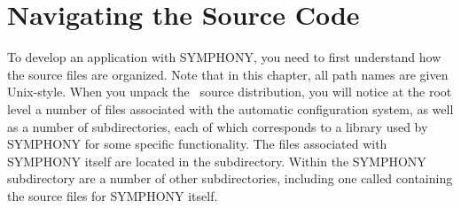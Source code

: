 
\section{Navigating the Source Code}

To develop an application with SYMPHONY, you need to first understand how the
source files are organized. Note that in this chapter, all path names are
given Unix-style. When you unpack the \BB\ source distribution, you will
notice at the root level a number of files associated with the automatic
configuration system, as well as a number of subdirectories, each of which
corresponds to a library used by SYMPHONY for some specific functionality. The
files associated with SYMPHONY itself are located in the 
subdirectory. Within the SYMPHONY subdirectory are a number of other
subdirectories, including one called  containing the source files
for SYMPHONY itself. 

